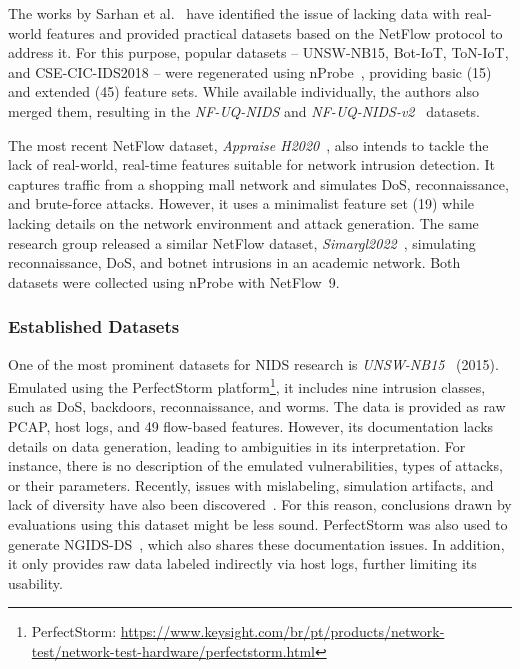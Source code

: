 The works by Sarhan et al.~\cite{sarhan2021_netflow_datasets_ml_nids, sarhan2022_nids_feature_set} have identified the issue of lacking data with real-world features and provided practical datasets based on the NetFlow protocol to address it. For this purpose, popular datasets -- UNSW-NB15, Bot-IoT, ToN-IoT, and CSE-CIC-IDS2018 -- were regenerated using nProbe~\cite{ntop_nprobe}, providing basic (15) and extended (45) feature sets. While available individually, the authors also merged them, resulting in the \emph{NF-UQ-NIDS} and \emph{NF-UQ-NIDS-v2}~\cite{sarhan2022_nids_feature_set} datasets.

The most recent NetFlow dataset, \emph{Appraise H2020}~\cite{komisarek2023_appraise_h2020_dataset}, also intends to tackle the lack of real-world, real-time features suitable for network intrusion detection. It captures traffic from a shopping mall network and simulates DoS, reconnaissance, and brute-force attacks. However, it uses a minimalist feature set (19) while lacking details on the network environment and attack generation. The same research group released a similar NetFlow dataset, \emph{Simargl2022}~\cite{komisarek2022_simargl2022}, simulating reconnaissance, DoS, and botnet intrusions in an academic network. Both datasets were collected using nProbe with NetFlow~9.

\subsubsection{Established Datasets}
\label{sssec:ndatasurv_general_established}

One of the most prominent datasets for NIDS research is \emph{UNSW-NB15}~\cite{moustafa2015_unswnb15} (2015). Emulated using the PerfectStorm platform\footnote{PerfectStorm: \url{https://www.keysight.com/br/pt/products/network-test/network-test-hardware/perfectstorm.html}}, it includes nine intrusion classes, such as DoS, backdoors, reconnaissance, and worms. The data is provided as raw PCAP, host logs, and 49 flow-based features. However, its documentation lacks details on data generation, leading to ambiguities in its interpretation. For instance, there is no description of the emulated vulnerabilities, types of attacks, or their parameters. Recently, issues with mislabeling, simulation artifacts, and lack of diversity have also been discovered~\cite{flood2024_bad_design_smells_nids_datasets}. For this reason, conclusions drawn by evaluations using this dataset might be less sound. PerfectStorm was also used to generate NGIDS-DS~\cite{haider2017_ngids_ds_dataset}, which also shares these documentation issues. In addition, it only provides raw data labeled indirectly via host logs, further limiting its usability.

